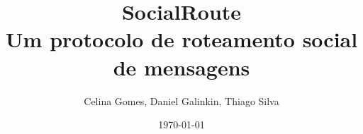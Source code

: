 \title[SocialRoute]
{\textbf{SocialRoute}
\\Um protocolo de roteamento social de mensagens}
\author[celina, dggc, thiagopes]{Celina Gomes, Daniel Galinkin, Thiago
Silva}


\subject{Redes Complexas}

\date{\today}
\frame{\titlepage}
